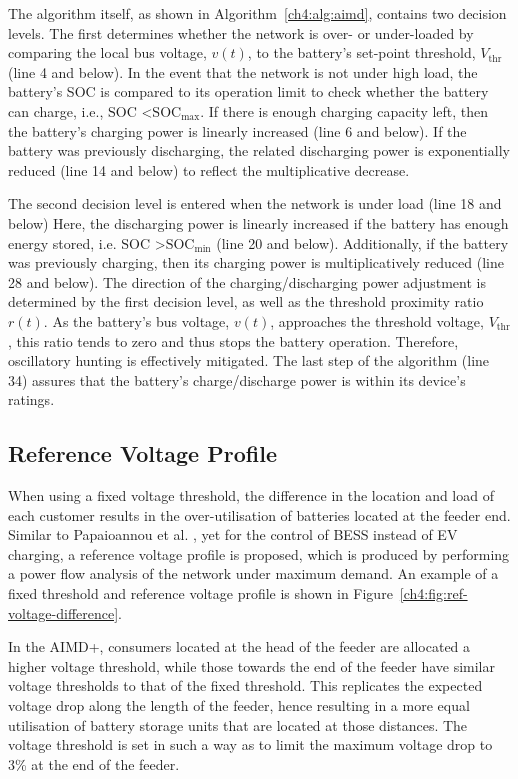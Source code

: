The algorithm itself, as shown in Algorithm~\ref{ch4:alg:aimd}, contains two decision levels.
The first determines whether the network is over- or under-loaded by comparing the local bus voltage, $v(t)$, to the battery's set-point threshold, $V_\text{thr}$ (line 4 and below).
In the event that the network is not under high load, the battery's SOC is compared to its operation limit to check whether the battery can charge, i.e., $\text{SOC}$ \textless $\text{SOC}_\text{max}$.
If there is enough charging capacity left, then the battery's charging power is linearly increased (line 6 and below).
If the battery was previously discharging, the related discharging power is exponentially reduced (line 14 and below) to reflect the multiplicative decrease.

The second decision level is entered when the network is under load (line 18 and below)
Here, the discharging power is linearly increased if the battery has enough energy stored, i.e. $\text{SOC}$ \textgreater $\text{SOC}_\text{min}$ (line 20 and below).
Additionally, if the battery was previously charging, then its charging power is multiplicatively reduced (line 28 and below).
The direction of the charging/discharging power adjustment is determined by the first decision level, as well as the threshold proximity ratio $r(t)$.
As the battery's bus voltage, $v(t)$, approaches the threshold voltage, $V_\text{thr}$, this ratio tends to zero and thus stops the battery operation.
Therefore, oscillatory hunting is effectively mitigated.
The last step of the algorithm (line 34) assures that the battery's charge/discharge power is within its device's ratings.

\subsection{Reference Voltage Profile}

When using a fixed voltage threshold, the difference in the location and load of each customer results in the over-utilisation of batteries located at the feeder end.
Similar to Papaioannou et al. \cite{Papaioannou2015}, yet for the control of BESS instead of EV charging, a reference voltage profile is proposed, which is produced by performing a power flow analysis of the network under maximum demand.
An example of a fixed threshold and reference voltage profile is shown in Figure~\ref{ch4:fig:ref-voltage-difference}.

In the AIMD+, consumers located at the head of the feeder are allocated a higher voltage threshold, while those towards the end of the feeder have similar voltage thresholds to that of the fixed threshold.
This replicates the expected voltage drop along the length of the feeder, hence resulting in a more equal utilisation of battery storage units that are located at those distances.
The voltage threshold is set in such a way as to limit the maximum voltage drop to 3\% at the end of the feeder.



